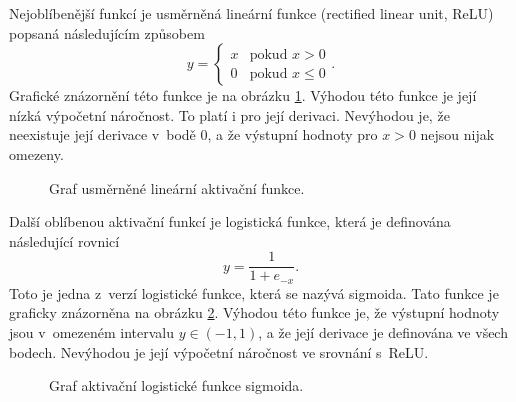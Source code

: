 Nejoblíbenější funkcí je usměrněná lineární funkce (rectified linear unit, ReLU) popsaná následujícím způsobem \begin{equation}y=\left\{\begin{array}{ll}x&\mbox{pokud }x>0\\0&\mbox{pokud }x\leq 0\end{array}\right..\label{eq:relu}\end{equation}
Grafické znázornění této funkce je na obrázku \ref{gr:relu}.
Výhodou této funkce je její nízká výpočetní náročnost.
To platí i pro její derivaci.
Nevýhodou je, že neexistuje její derivace v~bodě 0, a že výstupní hodnoty pro $x>0$ nejsou nijak omezeny.

\begin{figure}
\centering
{}
\caption{Graf usměrněné lineární aktivační funkce.}
\label{gr:relu}
\end{figure}

Další oblíbenou aktivační funkcí je logistická funkce, která je definována následující rovnicí \begin{equation}y=\frac{1}{1+e_{-x}}.\label{eq:sigmoid}\end{equation}
Toto je jedna z~verzí logistické funkce, která se nazývá sigmoida.
Tato funkce je graficky znázorněna na obrázku \ref{gr:sigmoid}.
Výhodou této funkce je, že výstupní hodnoty jsou v~omezeném intervalu $y \in (-1,1)$, a že její derivace je definována ve všech bodech.
Nevýhodou je její výpočetní náročnost ve srovnání s~ReLU.

\begin{figure}
\centering
{}
\caption{Graf aktivační logistické funkce sigmoida.}
\label{gr:sigmoid}
\end{figure}

